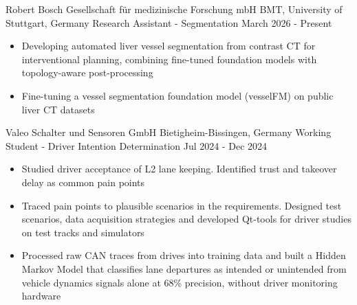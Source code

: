 \documentclass{bmsnkresume}
\begin{document}
\newcommand{\columnsectiontitle}[1]{%
  {\cvemphsize\color{darktext}\MakeUppercase{#1}}\par
  \noindent{\color{lighttext}\rule{\linewidth}{0.2pt}}%
  \vspace{0.2em}%
}

\newenvironment{academicsitems}{\begin{itemize}}{\end{itemize}}


\makeheader


\experience
  {Robert  Bosch  Gesellschaft  für  medizinische  Forschung  mbH}
  {BMT, University of Stuttgart, Germany}
  {Research Assistant - Segmentation}
  {March 2026 - Present}
\begin{itemize}
  \item Developing automated liver vessel segmentation from contrast CT for interventional planning, combining fine-tuned foundation models with topology-aware post-processing
  \item Fine-tuning a vessel segmentation foundation model (vesselFM) on public liver CT datasets
\end{itemize}
\vspace{-0.33em}

\experience
  {Valeo Schalter und Sensoren GmbH}
  {Bietigheim-Bissingen, Germany}
  {Working Student - Driver Intention Determination}
  {Jul 2024 - Dec 2024}
\begin{itemize}
  \item Studied driver acceptance of L2 lane keeping. Identified trust and takeover delay as common pain points 
  \item Traced pain points to plausible scenarios in the requirements. Designed test scenarios, data acquisition strategies and developed Qt-tools for driver studies on test tracks and simulators
  \item Processed raw CAN traces from drives into training data and built a Hidden Markov Model that classifies lane departures as intended or unintended from vehicle dynamics signals alone at 68\% precision, without driver monitoring hardware
\end{itemize}
\vspace{-0.33em}
\end{document}

